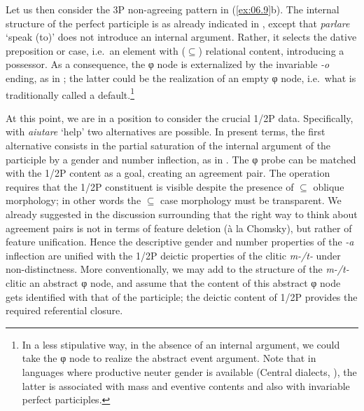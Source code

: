 \documentclass[output=paper]{langsci/langscibook}
\begin{document}
Let us then consider the 3P non-agreeing pattern in (\ref{ex:06.9}b). The
internal structure of the perfect participle is as already indicated in
, except that \emph{parlare} ‘speak (to)’ does not introduce an
internal argument. Rather, it selects the dative preposition or case, i.e.\ an
element with (${\subseteq}$) relational content, introducing a possessor. As a
consequence, the φ node is externalized by the invariable \emph{-o}
ending, as in ; the latter could be the realization of an empty
φ node, i.e.\ what is traditionally called a default.\footnote{In a less
    stipulative way, in the absence of an internal argument, we could take the
    φ node to realize the abstract event argument. Note that in 
    languages where productive neuter gender is available (Central 
dialects, \citealt{ManziniSavoia2005,ManziniSavoia2017}), the latter is
associated with mass and eventive contents and also with invariable perfect
participles.\label{fn:06.5}}

\ea%
    \label{ex:06.14}
\z

At this point, we are in a position to consider the crucial 1/2P data.
Specifically, with \emph{aiutare} ‘help’ two alternatives are possible. In
present terms, the first alternative consists in the partial saturation of the
internal argument of the participle by a gender and number inflection, as in
. The φ probe can be matched with the 1/2P content as
a goal, creating an agreement pair. The operation requires that the 1/2P
constituent is visible despite the presence of ${\subseteq}$ oblique
morphology; in other words the ${\subseteq}$ case morphology must be
transparent. We already suggested in the discussion surrounding
 that the right way to think about agreement pairs is not in
terms of feature deletion (à la Chomsky), but rather of feature unification.
Hence the descriptive gender and number properties of the \emph{-a} inflection
are unified with the 1/2P deictic properties of the clitic \emph{m-/t-} under
non-distinctness. More conventionally, we may add to
the structure of the \emph{m-/t-} clitic an abstract φ node, and
assume that the content of this abstract φ node gets identified with
that of the participle; the deictic content of 1/2P provides the required
referential closure.
\end{document}
